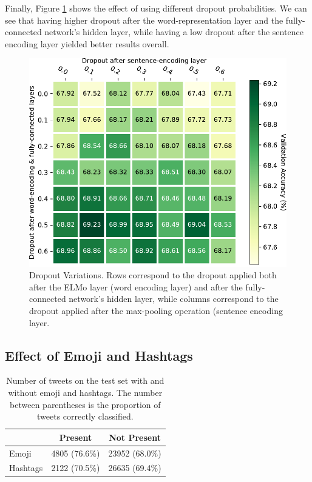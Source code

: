 \documentclass[11pt,a4paper]{article}
\begin{document}
Finally, Figure \ref{fig:dropouts} shows the effect of using different dropout probabilities. We can see that having higher dropout after the word-representation layer and the fully-connected network's hidden layer, while having a low dropout after the sentence encoding layer yielded better results overall. 

\begin{figure}[!h]
    \centering
    \includegraphics[width=\columnwidth]{images/dropout_table.pdf}
\caption{Dropout Variations. Rows correspond to the dropout applied both after the ELMo layer (word encoding layer) and after the fully-connected network's hidden layer, while columns correspond to the dropout applied after the max-pooling operation (sentence encoding layer.}
\label{fig:dropouts}
\end{figure}

\subsection{Effect of Emoji and Hashtags}%
\label{sub:effect_of_emoji_and_hashtags}

\begin{table}[!h]
    \centering
    \footnotesize

    \begin{tabular}{lcc}

        \textbf{} & \textbf{Present} & \textbf{Not Present} \\
        \hline
        \hline
        Emoji     & 4805 (76.6\%)    & 23952 (68.0\%)       \\
        Hashtags  & 2122 (70.5\%)    & 26635 (69.4\%)       \\

    \end{tabular}

    \caption{Number of tweets on the test set with and without emoji and
    hashtags. The number between parentheses is the proportion of tweets
    correctly classified.}

    \label{table:emoji_and_hashtags}

\end{table}
\end{document}
